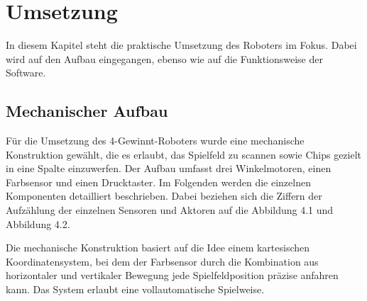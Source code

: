 \chapter{ Umsetzung}
\label{cha:Umsetzung}
In diesem Kapitel steht die praktische Umsetzung des Roboters im Fokus. Dabei wird auf den Aufbau eingegangen, ebenso wie auf die Funktionsweise der Software. 

\section{Mechanischer Aufbau}
Für die Umsetzung des 4-Gewinnt-Roboters wurde eine mechanische Konstruktion gewählt, die es erlaubt, das Spielfeld zu scannen sowie Chips gezielt in eine Spalte einzuwerfen. Der Aufbau umfasst drei Winkelmotoren, einen Farbsensor und einen Drucktaster. Im Folgenden werden die einzelnen Komponenten detailliert beschrieben. Dabei beziehen sich die Ziffern der Aufzählung der einzelnen Sensoren und Aktoren auf die Abbildung 4.1 und Abbildung 4.2.

Die mechanische Konstruktion basiert auf die Idee einem kartesischen Koordinatensystem, bei dem der Farbsensor durch die Kombination aus horizontaler und vertikaler Bewegung jede Spielfeldposition präzise anfahren kann. Das System erlaubt eine vollautomatische Spielweise.

